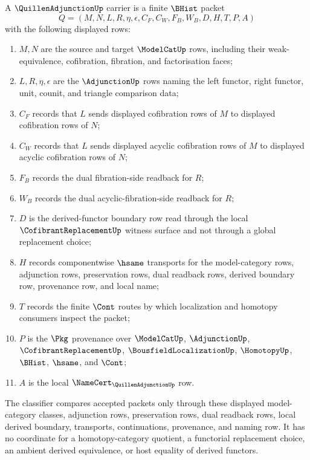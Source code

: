 \begin{definition}
\label{def:quillen-adjunction-carrier}
A $\QuillenAdjunctionUp$ carrier is a finite $\BHist$ packet
$$
Q=(M,N,L,R,\eta,\epsilon,C_F,C_W,F_B,W_B,D,H,T,P,A)
$$
with the following displayed rows:
\begin{enumerate}
\item $M,N$ are the source and target $\ModelCatUp$ rows, including their weak-equivalence, cofibration, fibration, and factorisation faces;
\item $L,R,\eta,\epsilon$ are the $\AdjunctionUp$ rows naming the left functor, right functor, unit, counit, and triangle comparison data;
\item $C_F$ records that $L$ sends displayed cofibration rows of $M$ to displayed cofibration rows of $N$;
\item $C_W$ records that $L$ sends displayed acyclic cofibration rows of $M$ to displayed acyclic cofibration rows of $N$;
\item $F_B$ records the dual fibration-side readback for $R$;
\item $W_B$ records the dual acyclic-fibration-side readback for $R$;
\item $D$ is the derived-functor boundary row read through the local $\CofibrantReplacementUp$ witness surface and not through a global replacement choice;
\item $H$ records componentwise $\hsame$ transports for the model-category rows, adjunction rows, preservation rows, dual readback rows, derived boundary row, provenance row, and local name;
\item $T$ records the finite $\Cont$ routes by which localization and homotopy consumers inspect the packet;
\item $P$ is the $\Pkg$ provenance over $\ModelCatUp$, $\AdjunctionUp$, $\CofibrantReplacementUp$, $\BousfieldLocalizationUp$, $\HomotopyUp$, $\BHist$, $\hsame$, and $\Cont$;
\item $A$ is the local $\NameCert_{\QuillenAdjunctionUp}$ row.
\end{enumerate}
The classifier compares accepted packets only through these displayed model-category classes, adjunction rows, preservation rows, dual readback rows, local derived boundary, transports, continuations, provenance, and naming row. It has no coordinate for a homotopy-category quotient, a functorial replacement choice, an ambient derived equivalence, or host equality of derived functors.
\end{definition}

